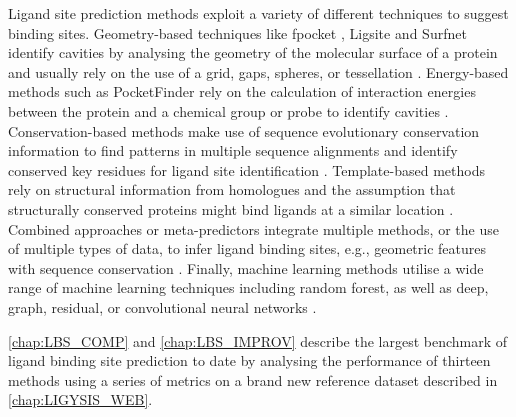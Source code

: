 Ligand site prediction methods exploit a variety of different techniques to suggest binding sites. Geometry-based techniques like fpocket \cite{GUILLOUX_2009_FPOCKET}, Ligsite \cite{HENDLICH_1997_LIGSITE} and Surfnet \cite{LASKOWSKI_1995_SURFNET} identify cavities by analysing the geometry of the molecular surface of a protein and usually rely on the use of a grid, gaps, spheres, or tessellation \cite{GUILLOUX_2009_FPOCKET, LIANG_1998_CAVITIES, HENDLICH_1997_LIGSITE, LASKOWSKI_1995_SURFNET, KLEYWEGT_1994_CAVITIES, LEVITT_1992_POCKET, BRADY_2000_PASS, WEISEL_2007_POCKETPICKER}. Energy-based methods such as PocketFinder \cite{AN_2005_POCKETFINDER} rely on the calculation of interaction energies between the protein and a chemical group or probe to identify cavities \cite{AN_2005_POCKETFINDER, GOODFORD_1982_PREDICTOR, AN_2004_PREDICTOR, LAURIE_2005_QSITEFINDER, GHERSI_2009_SITEHOUND, NGAN_2012_FTSITE}. Conservation-based methods make use of sequence evolutionary conservation information to find patterns in multiple sequence alignments and identify conserved key residues for ligand site identification \cite{ARMON_2001_SCORE, PUPKO_2002_RATE4SITE, XIE_2012_CONSPRED}. Template-based methods rely on structural information from homologues and the assumption that structurally conserved proteins might bind ligands at a similar location \cite{ZVELEBIL_1987_PREDICTION, WASS_2010_3DLIGANDSITE, ROY_2012_COFACTOR, YANG_2013_COFACTOR, LEE_2013_PREDICTION, BRYLINSKI_2013_EFINDSITE}. Combined approaches or meta-predictors integrate multiple methods, or the use of multiple types of data, to infer ligand binding sites, e.g., geometric features with sequence conservation \cite{GUTTERIDGE_2003_LBSP, HUANG_2006_BU48, GLASER_2006_PREDICTION, HALGREN_2009_PREDICITON, CAPRA_2009_CONCAVITY, HUANG_2009_METAPOCKET, BRAY_2009_SITESIDENTIFY, BRYLINSKI_2009_FINDSITE}. Finally, machine learning methods utilise a wide range of machine learning techniques including random forest, as well as deep, graph, residual, or convolutional neural networks \cite{KRIVAK_2015_PRANK, KRIVAK_2015_P2RANK, JIMENEZ_2017_DEEPSITE, KRIVAK_2018_P2RANK, SANTANA_2020_GRaSP, KOZLOVSKII_2020_BITENET, STEPNIEWSKA_2020_KALASANTY, KANDEL_2021_PURESNET, MYOLNAS_2021_DEEPSURF, YAN_2022_POINTSITE, LI_2022_RECURPOCKET, AGGARWAL_2022_DEEPPOCKET, ABDOLLAHI_2023_NODECODER, EVTEEV_2023_SITERADAR, LI_2023_GLPOCKET, ZHANG_2024_EQUIPOCKET, LIU_2023_REFINEPOCKET, SMITH_2024_GrASP, CARBERY_2024_IFSP, SESTAK_2024_VNEGNN, KANDEL_2024_PURESNET}.

\autoref{chap:LBS_COMP} and \autoref{chap:LBS_IMPROV} describe the largest benchmark of ligand binding site prediction to date by analysing the performance of thirteen methods using a series of metrics on a brand new reference dataset described in \autoref{chap:LIGYSIS_WEB}.

